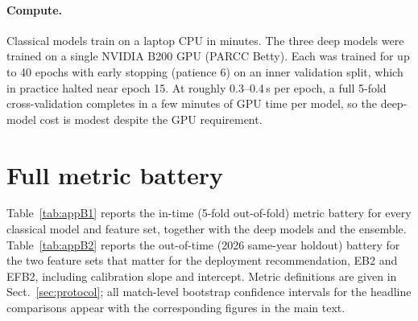 \documentclass[11pt,a4paper]{article}
\begin{document}
\paragraph{Compute.} Classical models train on a laptop CPU in minutes. The three deep models were
trained on a single NVIDIA B200 GPU (PARCC Betty). Each was trained for up to 40 epochs with early
stopping (patience 6) on an inner validation split, which in practice halted near epoch 15. At roughly
0.3--0.4\,s per epoch, a full 5-fold cross-validation completes in a few minutes of GPU time per model,
so the deep-model cost is modest despite the GPU requirement.

\section{Full metric battery}
\label{app:metrics}

Table~\ref{tab:appB1} reports the in-time (5-fold out-of-fold) metric battery for every classical
model and feature set, together with the deep models and the ensemble. Table~\ref{tab:appB2} reports
the out-of-time (2026 same-year holdout) battery for the two feature sets that matter for the
deployment recommendation, EB2 and EFB2, including calibration slope and intercept. Metric definitions
are given in Sect.~\ref{sec:protocol}; all match-level bootstrap confidence intervals for the headline
comparisons appear with the corresponding figures in the main text.
\end{document}
